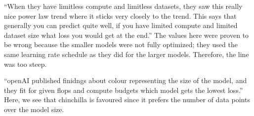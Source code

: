 \documentclass[11pt]{article}
\begin{document}
\begin{minipage}[l]{.5\linewidth}
    \begin{figure}[H]
        \centering
    \end{figure}    
\end{minipage}\hfill
\begin{minipage}[r]{.48\linewidth}
    ``When they have limitless compute and limitless datasets, they saw this really nice power law trend where it sticks very closely to the trend. This says that generally you can predict quite well, if you have limited compute and limited dataset size what loss you would get at the end.''
    The values here were proven to be wrong because the smaller models were not fully optimized; they used the same learning rate schedule as they did for the larger models. Therefore, the line was too steep.
\end{minipage}

\begin{minipage}[l]{.5\linewidth}
    \begin{figure}[H]
        \centering
    \end{figure}    
\end{minipage}\hfill
\begin{minipage}[r]{.48\linewidth}
    ``openAI published finidngs about colour representing the size of the model, and they fit for given flops and compute budgets which model gets the lowest loss.'' 
    Here, we see that chinchilla is favoured since it prefers the number of data points over the model size.
\end{minipage}
\end{document}
